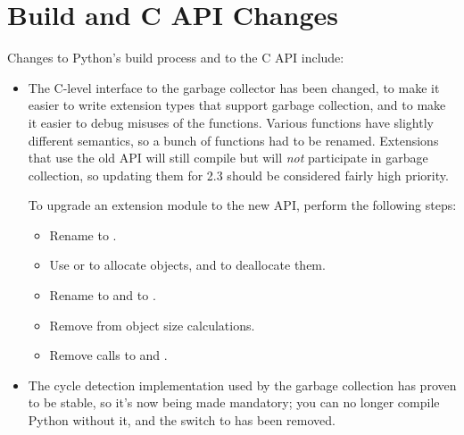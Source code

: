 \documentclass{howto}
\begin{document}
\section{Build and C API Changes}

Changes to Python's build process and to the C API include:

\begin{itemize}

\item The C-level interface to the garbage collector has been changed,
to make it easier to write extension types that support garbage
collection, and to make it easier to debug misuses of the functions.
Various functions have slightly different semantics, so a bunch of
functions had to be renamed.  Extensions that use the old API will
still compile but will \emph{not} participate in garbage collection,
so updating them for 2.3 should be considered fairly high priority.

To upgrade an extension module to the new API, perform the following
steps:

\begin{itemize}

\item Rename  to .

\item Use  or  to
allocate objects, and  to deallocate them.

\item Rename  to  and
 to .

\item Remove  from object size calculations.

\item Remove calls to  and .

\end{itemize}

\item The cycle detection implementation used by the garbage collection
has proven to be stable, so it's now being made mandatory; you can no
longer compile Python without it, and the
 switch to  has been removed.


\end{itemize}
\end{document}
